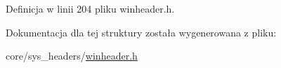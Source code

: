 Definicja w linii 204 pliku winheader.\-h.



Dokumentacja dla tej struktury została wygenerowana z pliku\-:\begin{DoxyCompactItemize}
\item 
core/sys\-\_\-headers/\hyperlink{winheader_8h}{winheader.\-h}\end{DoxyCompactItemize}
